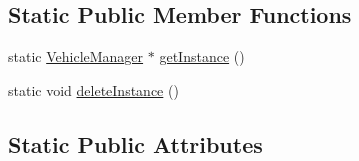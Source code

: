 \subsection*{Static Public Member Functions}
\begin{DoxyCompactItemize}
\item 
static \hyperlink{classtraci__api_1_1_vehicle_manager}{Vehicle\+Manager} $\ast$ \hyperlink{classtraci__api_1_1_vehicle_manager_a2f2e2b5647eda9af94094da62788cd2e}{get\+Instance} ()
\item 
static void \hyperlink{classtraci__api_1_1_vehicle_manager_ac1ff1be2d47078aae68f6ed9ef5ff187}{delete\+Instance} ()
\end{DoxyCompactItemize}
\subsection*{Static Public Attributes}
